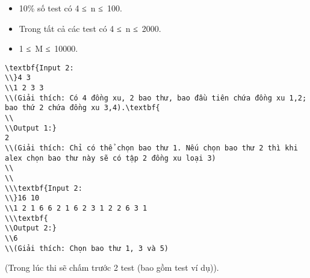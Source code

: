 \begin{itemize}
	\item     10\% số test có 4 ≤ n ≤ 100.   
	\item     Trong tất cả các test có 4 ≤ n ≤ 2000.   
	\item     1 ≤ M ≤ 10000.   
\end{itemize}
\begin{itemize}
\end{itemize}
\begin{verbatim}
\textbf{Input 2:
\\}4 3
\\1 2 3 3
\\(Giải thích: Có 4 đồng xu, 2 bao thư, bao đầu tiên chứa đồng xu 1,2; bao thứ 2 chứa đồng xu 3,4).\textbf{
\\
\\Output 1:}
2
\\(Giải thích: Chỉ có thể chọn bao thư 1. Nếu chọn bao thư 2 thì khi alex chọn bao thư này sẽ có tập 2 đồng xu loại 3)
\\
\\
\\\textbf{Input 2:
\\}16 10
\\1 2 1 6 6 2 1 6 2 3 1 2 2 6 3 1
\\\textbf{
\\Output 2:}
\\6
\\(Giải thích: Chọn bao thư 1, 3 và 5)\end{verbatim}

(Trong lúc thi sẽ chấm trước 2 test (bao gồm test ví dụ)).